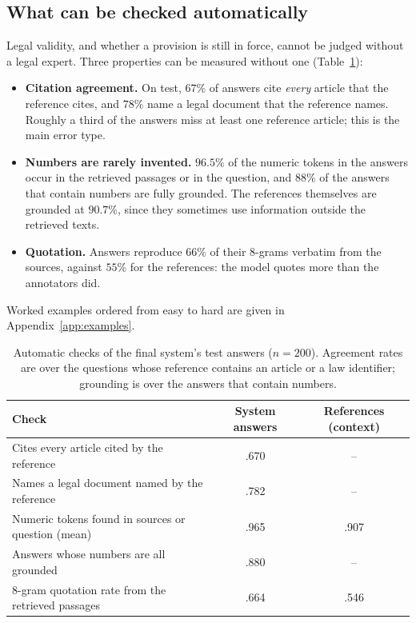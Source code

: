 \documentclass[11pt,a4paper]{article}
\begin{document}
\subsection{What can be checked automatically}
Legal validity, and whether a provision is still in force, cannot be judged without a legal expert. Three properties can be measured without one (Table~\ref{tab:checks}):
\begin{itemize}[leftmargin=*]
\item \textbf{Citation agreement.} On test, $67\%$ of answers cite \emph{every} article that the reference cites, and $78\%$ name a legal document that the reference names. Roughly a third of the answers miss at least one reference article; this is the main error type.
\item \textbf{Numbers are rarely invented.} $96.5\%$ of the numeric tokens in the answers occur in the retrieved passages or in the question, and $88\%$ of the answers that contain numbers are fully grounded. The references themselves are grounded at $90.7\%$, since they sometimes use information outside the retrieved texts.
\item \textbf{Quotation.} Answers reproduce $66\%$ of their 8-grams verbatim from the sources, against $55\%$ for the references: the model quotes more than the annotators did.
\end{itemize}
Worked examples ordered from easy to hard are given in Appendix~\ref{app:examples}.
\begin{table}[H]
\centering
\caption{Automatic checks of the final system's test answers ($n{=}200$). Agreement rates are over the questions whose reference contains an article or a law identifier; grounding is over the answers that contain numbers.}\label{tab:checks}
\begin{tabular}{@{}lcc@{}}
\toprule
Check & System answers & References (context)\\
\midrule
Cites every article cited by the reference & .670 & --\\
Names a legal document named by the reference & .782 & --\\
Numeric tokens found in sources or question (mean) & .965 & .907\\
Answers whose numbers are all grounded & .880 & --\\
8-gram quotation rate from the retrieved passages & .664 & .546\\
\bottomrule
\end{tabular}
\end{table}
\end{document}
